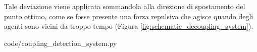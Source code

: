 Tale deviazione viene applicata sommandola alla direzione di spostamento del punto ottimo, come se fosse presente una forza repulsiva che agisce quando degli agenti sono vicini da troppo tempo (Figura \ref{fig:schematic_decoupling_system}).


{code/coupling_detection_system.py}